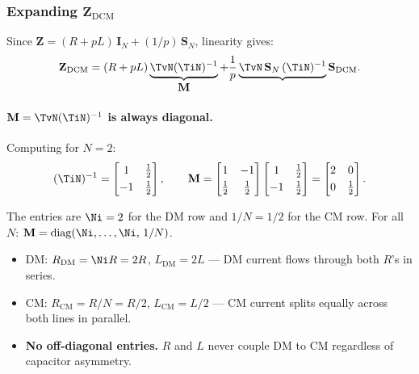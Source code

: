 \subsubsection*{Expanding $\mathbf{Z}_{\mathrm{DCM}}$}

Since $\mathbf{Z} = (R + pL)\,\mathbf{I}_N + (1/p)\,\mathbf{S}_N$,
linearity gives:
\[
    \mathbf{Z}_{\mathrm{DCM}}
    = (R + pL)\underbrace{\TvN(\TiN)^{-1}}_{\displaystyle\mathbf{M}}
    + \frac{1}{p}\underbrace{\TvN\,\mathbf{S}_N\,(\TiN)^{-1}}
                             {\displaystyle\mathbf{S}_{\mathrm{DCM}}}.
\]

\paragraph{$\mathbf{M} = \TvN(\TiN)^{-1}$ is always diagonal.}

Computing for $N = 2$:
\[
    (\TiN)^{-1}
    = \begin{bmatrix}1 & \tfrac{1}{2} \\[3pt] -1 & \tfrac{1}{2}\end{bmatrix},
    \qquad
    \mathbf{M}
    =
    \begin{bmatrix}1 & -1 \\[3pt] \tfrac{1}{2} & \tfrac{1}{2}\end{bmatrix}
    \begin{bmatrix}1 & \tfrac{1}{2} \\[3pt] -1 & \tfrac{1}{2}\end{bmatrix}
    =
    \begin{bmatrix}2 & 0 \\[3pt] 0 & \tfrac{1}{2}\end{bmatrix}.
\]

The entries are $\Ni = 2$ for the DM row and $1/N = 1/2$ for the CM
row.  For all $N$:
$\mathbf{M} = \operatorname{diag}(\Ni,\ldots,\Ni,\,1/N)$.

\begin{circuitbox}
\begin{itemize}
    \item DM: $R_{\mathrm{DM}} = \Ni R = 2R$,\; $L_{\mathrm{DM}} = 2L$
          — DM current flows through both $R$'s in series. \checkmark
    \item CM: $R_{\mathrm{CM}} = R/N = R/2$,\; $L_{\mathrm{CM}} = L/2$
          — CM current splits equally across both lines in parallel. \checkmark
    \item \textbf{No off-diagonal entries.}  $R$ and $L$ never couple
          DM to CM regardless of capacitor asymmetry.
\end{itemize}
\end{circuitbox}

